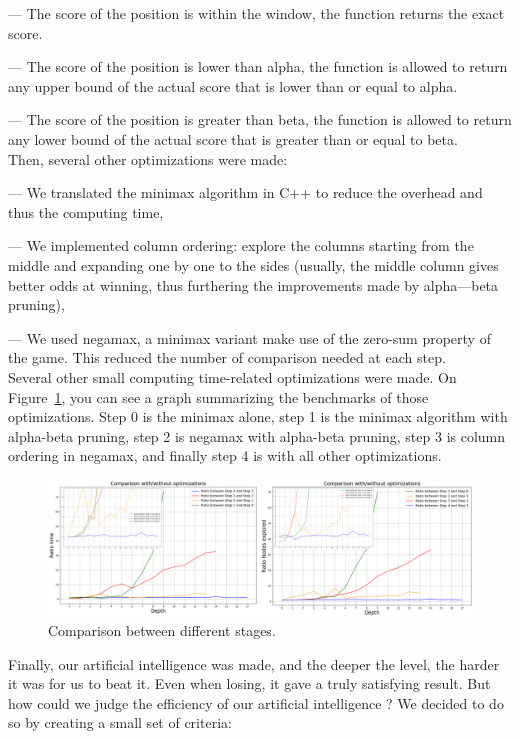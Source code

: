 \documentclass[11pt, a4paper, oneside]{report}
\begin{document}
	— The score of the position is within the window, the function returns the exact score.
	
	— The score of the position is lower than alpha, the function is allowed to return any upper bound of the actual score that is lower than or equal to alpha.

	— The score of the position is greater than beta, the function is allowed to return any lower bound of the actual score that is greater than or equal to beta. \\
	Then, several other optimizations were made:
	
	— We translated the minimax algorithm in C++ to reduce the overhead and thus the computing time,

	— We implemented column ordering: explore the columns starting from the middle and expanding one by one to the sides (usually, the middle column gives better odds at winning, thus furthering the improvements made by alpha—beta pruning),

	— We used negamax, a minimax variant make use of the zero-sum property of the game. This reduced the number of comparison needed at each step. \\

	Several other small computing time-related optimizations were made. On Figure~\ref{fig:ai_benchmarks}, you can see a graph summarizing the benchmarks of those optimizations. Step 0 is the minimax alone, step 1 is the minimax algorithm with alpha-beta pruning, step 2 is negamax with alpha-beta pruning, step 3 is column ordering in negamax, and finally step 4 is with all other optimizations. \\

	\begin{figure}[ht]
		\includegraphics[scale=0.7]{Comparison_ai_stages.png}
		\centering
		\caption{Comparison between different stages.}\label{fig:ai_benchmarks}
	\end{figure}
	Finally, our artificial intelligence was made, and the deeper the level, the harder it was for us to beat it. Even when losing, it gave a truly satisfying result. But how could we judge the efficiency of our artificial intelligence ? We decided to do so by creating a small set of criteria:
\end{document}
